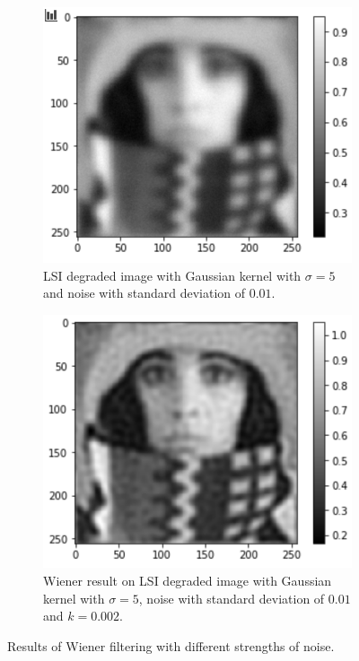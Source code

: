\begin{figure}[H]
\begin{subfigure}[b]{0.45\linewidth}
	\end{subfigure}
	\\
	\begin{subfigure}[b]{0.45\linewidth}
		\centering
		\includegraphics[width=\linewidth]{Materials/E5/w7before}
		\caption{LSI degraded image with Gaussian kernel with $\sigma = 5$ and noise with standard deviation of $0.01$.}
	\end{subfigure}
	\hfill
	\begin{subfigure}[b]{0.45\linewidth}
		\centering
		\includegraphics[width=\linewidth]{Materials/E5/w7after}
		\caption{Wiener result on LSI degraded image with Gaussian kernel with $\sigma = 5$, noise with standard deviation of $0.01$ and $k = 0.002$.}
	\end{subfigure}
	\caption{Results of Wiener filtering with different strengths of noise.}
	\label{wienerextreme}
\end{figure}

